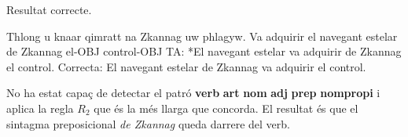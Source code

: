 \begin{enumerate}
     Resultat correcte.

     \begin{example}
     \gll Thlong u knaar qimratt na Zkannag uw phlagyw.
          {Va adquirir} el navegant estelar de Zkannag el-OBJ control-OBJ
     \glt TA: *El navegant estelar va adquirir de Zkannag el control.
     \glt Correcta: El navegant estelar de Zkannag va adquirir el control.
     \glend
     \end{example}

     No ha estat capaç de detectar el patró \textbf{verb} \textbf{art}
     \textbf{nom} \textbf{adj} \textbf{prep}
     \textbf{nompropi} i aplica la regla $R_2$ que és la més llarga
     que concorda. El resultat és que el sintagma preposicional
     \emph{de Zkannag} queda darrere del verb.



  
  



\end{enumerate}
